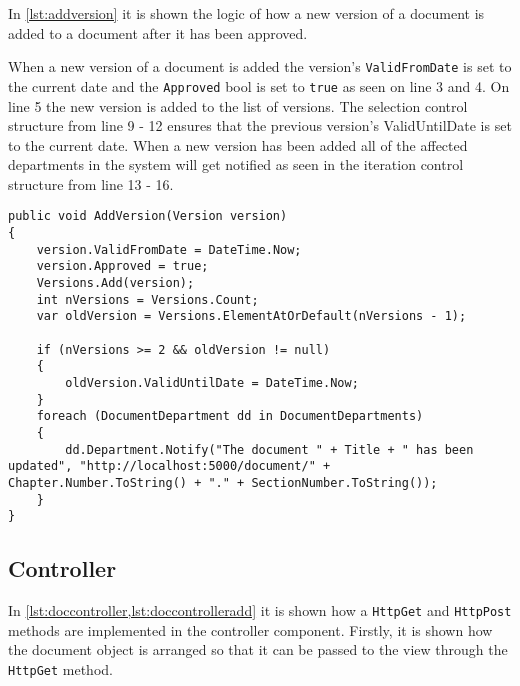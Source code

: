 In \cref{lst:addversion} it is shown the logic of how a new version of a document is added to a document after it has been approved.

When a new version of a document is added the version's \texttt{ValidFromDate} is set to the current date and the \texttt{Approved} bool is set to \texttt{true} as seen on line 3 and 4.
On line 5 the new version is added to the list of versions.
The selection control structure from line 9 - 12 ensures that the previous version's ValidUntilDate is set to the current date.
When a new version has been added all of the affected departments in the system will get notified as seen in the iteration control structure from line 13 - 16.
\\

\begin{lstlisting}[caption={Document Model: AddVersion}, label={lst:addversion}]
public void AddVersion(Version version)
{
	version.ValidFromDate = DateTime.Now;
	version.Approved = true;
	Versions.Add(version);
	int nVersions = Versions.Count;
	var oldVersion = Versions.ElementAtOrDefault(nVersions - 1);

	if (nVersions >= 2 && oldVersion != null)
	{
		oldVersion.ValidUntilDate = DateTime.Now;
	}
	foreach (DocumentDepartment dd in DocumentDepartments)
	{
		dd.Department.Notify("The document " + Title + " has been updated", "http://localhost:5000/document/" + Chapter.Number.ToString() + "." + SectionNumber.ToString());
	}
}
\end{lstlisting}

\subsection{Controller}

In \cref{lst:doccontroller,lst:doccontrolleradd} it is shown how a \texttt{HttpGet} and \texttt{HttpPost} methods are implemented in the controller component.
Firstly, it is shown how the document object is arranged so that it can be passed to the view through the \texttt{HttpGet} method.
\\

